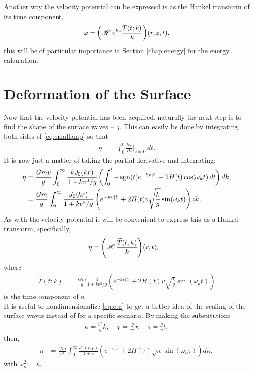 Another way the velocity potential can be expressed is as the Hankel transform of its time component,
\begin{align}
\varphi = {\left( \operatorname{\mathscr{H}}_{} e^{kz}\frac{T(t;k)}{k} \right) }(r,z,t),
\label{eq:phihank}
\end{align}
this will be of particular importance in Section \ref{chap:energy} for the energy calculation.

\section{Deformation of the Surface}

Now that the velocity potential has been acquired, naturally the next step is to find the shape of the surface waves -- $\eta$. This can easily be done by integrating both sides of \eqref{eq:smallamp} so that 
\begin{align*}
\eta &= \int_0^t \frac{\partial \varphi}{\partial z} \bigg|_{z=0} \, dt.
\end{align*}
It is now just a matter of taking the partial derivative and integrating:
\begin{align}
\eta &= \frac{Gmv}{g} \int_0^\infty \frac{k J_0(kr)}{1+kv^2/g} \left( \int_0^t  -\operatorname{sgn}(t)e^{-kv|t|} + 2H(t)\cos(\omega_k t) \, dt \right) dk, \nonumber \\
&= \frac{Gm}{g} \int_0^\infty \frac{J_0(kr)}{1+kv^2/g} \left( e^{-kv|t|} + 2H(t) v \sqrt{\frac{k}{g}} \sin(\omega_k t) \right) dk.
\label{eq:eta}
\end{align}
As with the velocity potential it will be convenient to express this as a Hankel transform, specifically,
\begin{align*}
\eta &= {\left( \operatorname{\mathscr{H}}_{} \frac{\widetilde{T}(t;k)}{k} \right) }(r,t),
\label{eq:etahank}
\end{align*}
where
\begin{align*}
\widetilde{T}(t;k) &= \frac{Gm}{g} \frac{1}{1+kv^2/g} \left( e^{-kv|t|} + 2H(t) v \sqrt{\frac{k}{g}} \sin(\omega_k t) \right)
\end{align*}
is the time component of $\eta$. \\

It is useful to nondimensionalize \eqref{eq:eta} to get a better idea of the scaling of the surface waves instead of for a specific scenario. By making the substitutions
\begin{align*}
\kappa = \frac{v^2}{g}k, \quad \chi = \frac{g}{v^2}r, \quad \tau = \frac{g}{v}t,
\end{align*}
then,
\begin{align*}
\eta &= \frac{Gm}{v^2} \int_0^\infty \frac{J_0(\kappa \chi)}{1+\kappa} \left( e^{-\kappa|\tau|} + 2H(\tau) \sqrt{\kappa} \sin(\omega_\kappa \tau) \right) d\kappa,
\end{align*}
with $\omega_\kappa^2 = \kappa$.

